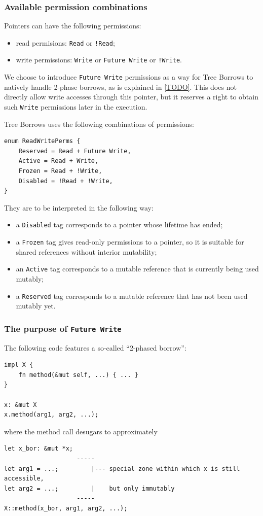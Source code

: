 \documentclass[a4paper,11pt]{article}
\theoremstyle{plain}
\theoremstyle{definition}
\theoremstyle{remark}
\newcommand{\tperm}[1]{\texttt{#1}}
\begin{document}
\subsubsection{Available permission combinations}

Pointers can have the following permissions:
\begin{itemize}
    \item read permisions: \tperm{Read} or \tperm{!Read};
    \item write permissions: \tperm{Write} or \tperm{Future Write} or \tperm{!Write}.
\end{itemize}

We choose to introduce \tperm{Future Write} permissions as a way for Tree Borrows to
natively handle 2-phase borrows, as is explained in \ref{TODO}.
This does not directly allow write accesses through this pointer, but it reserves
a right to obtain such \tperm{Write} permissions later in the execution.

Tree Borrows uses the following combinations of permissions:
\begin{lstlisting}
enum ReadWritePerms {
    Reserved = Read + Future Write,
    Active = Read + Write,
    Frozen = Read + !Write,
    Disabled = !Read + !Write,
}
\end{lstlisting}

They are to be interpreted in the following way:
\begin{itemize}
    \item a \tperm{Disabled} tag corresponds to a pointer whose lifetime has ended;
    \item a \tperm{Frozen} tag gives read-only permissions to a pointer, so it is suitable
        for shared references without interior mutability;
    \item an \tperm{Active} tag corresponds to a mutable reference that is currently being used mutably;
    \item a \tperm{Reserved} tag corresponds to a mutable reference that has not been used mutably yet.
\end{itemize}

\subsubsection{The purpose of \tperm{Future Write}}

The following code features a so-called ``2-phased borrow'':
\begin{lstlisting}
impl X {
    fn method(&mut self, ...) { ... }
}

x: &mut X
x.method(arg1, arg2, ...);
\end{lstlisting}
where the method call desugars to approximately
\begin{lstlisting}
let x_bor: &mut *x;
                    -----
let arg1 = ...;         |--- special zone within which x is still accessible,
let arg2 = ...;         |    but only immutably
                    -----
X::method(x_bor, arg1, arg2, ...);
\end{lstlisting}
\end{document}
